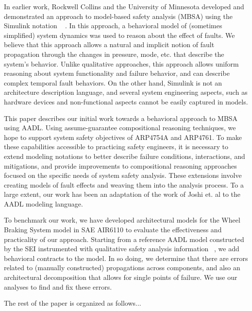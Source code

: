 In earlier work, Rockwell Collins and the University of Minnesota developed and demonstrated an approach to model-based safety analysis (MBSA) \cite {Joshi05:Dasc}   using the Simulink notation \cite{Joshi05:SafeComp} ~ .  In this approach, a behavioral model of (sometimes simplified) system dynamics was used to reason about the effect of faults.  We believe that this approach allows a natural and implicit notion of fault propagation through the changes in pressure, mode, etc. that describe the system's behavior.  Unlike qualitative approaches, this approach allows uniform reasoning about system functionality and failure behavior, and can describe complex temporal fault behaviors.  On the other hand, Simulink is not an architecture description language, and several system engineering aspects, such as hardware devices and non-functional aspects cannot be easily captured in models.

\iffalse
Over the last five years, several research groups have focused on formal reasoning at the system architecture level, resulting in MBSE tools that incorporate assume-guarantee compositional reasoning techniques~\cite{Trento and Rockwell and UMN}.  These tools allow behavioral reasoning about complex system models, but with substantially greater scalability than previous approaches.
\fi 

This paper describes our initial work towards a behavioral approach to MBSA using AADL.  Using assume-guarantee compositional reasoning techniques, we hope to support system safety objectives of ARP4754A and ARP4761.  To make these capabilities accessible to practicing safety engineers, it is necessary to extend modeling notations to better describe failure conditions, interactions, and mitigations, and provide improvements to compositional reasoning approaches focused on the specific needs of system safety analysis.  These extensions involve creating models of fault effects and weaving them into the analysis process.  To a large extent, our work has been an adaptation of the work of Joshi et. al to the AADL modeling language.

To benchmark our work, we have developed architectural models for the Wheel Braking System model in SAE AIR6110 to evaluate the effectiveness and practicality of our approach.  Starting from a reference AADL model constructed by the SEI instrumented with qualitative safety analysis information~\cite{SEI:AADL} , we add behavioral contracts to the model.  In so doing, we determine that there are errors related to (manually constructed) propagations across components, and also an architectural decomposition that allows for single points of failure.  We use our analyses to find and fix these errors.

The rest of the paper is organized as follows...



